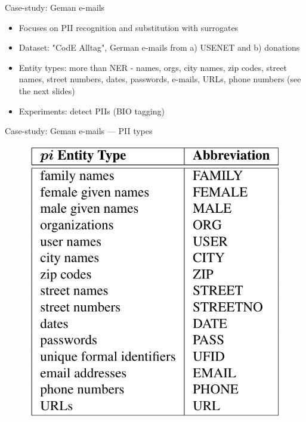 \documentclass[12pt,aspectratio=169,handout]{beamer}
\begin{document}
\begin{frame}{Case-study: Geman e-mails}

\begin{itemize}
\item Focuses on PII recognition and substitution with surrogates
\item Dataset: "CodE Alltag", German e-mails from a) USENET and b) donations
\item Entity types: more than NER - names, orgs, city names, zip codes, street names, street numbers, dates, passwords, e-mails, URLs, phone numbers (see the next slides)
\item Experiments: detect PIIs (BIO tagging)
\end{itemize}


\end{frame}


\begin{frame}{Case-study: Geman e-mails --- PII types}

\begin{figure}
\includegraphics[width=0.55\linewidth]{img/eder-et-al-2.png}
\end{figure}


\end{frame}
\end{document}
